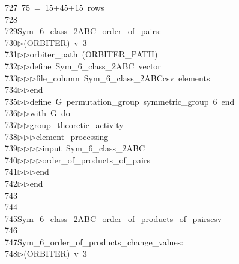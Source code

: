 \begin{tabbing}
727\>\ 75\ =\ 15+45+15\ rows\ \\[0pt]
728\>\\[0pt]
729\>Sym\_6\_class\_2ABC\_order\_of\_pairs:\\[0pt]
730\>$\triangleright$\>(ORBITER)\ v\ 3\ \\[0pt]
731\>$\triangleright$\>$\triangleright$\>orbiter\_path\ (ORBITER\_PATH)\ \\[0pt]
732\>$\triangleright$\>$\triangleright$\>define\ Sym\_6\_class\_2ABC\ vector\ \\[0pt]
733\>$\triangleright$\>$\triangleright$\>$\triangleright$\>file\_column\ Sym\_6\_class\_2ABCcsv\ elements\ \\[0pt]
734\>$\triangleright$\>$\triangleright$\>end\ \\[0pt]
735\>$\triangleright$\>$\triangleright$\>define\ G\ permutation\_group\ symmetric\_group\ 6\ end\ \\[0pt]
736\>$\triangleright$\>$\triangleright$\>with\ G\ do\ \\[0pt]
737\>$\triangleright$\>$\triangleright$\>group\_theoretic\_activity\ \\[0pt]
738\>$\triangleright$\>$\triangleright$\>$\triangleright$\>element\_processing\ \\[0pt]
739\>$\triangleright$\>$\triangleright$\>$\triangleright$\>$\triangleright$\>input\ Sym\_6\_class\_2ABC\ \\[0pt]
740\>$\triangleright$\>$\triangleright$\>$\triangleright$\>$\triangleright$\>order\_of\_products\_of\_pairs\ \\[0pt]
741\>$\triangleright$\>$\triangleright$\>$\triangleright$\>end\ \\[0pt]
742\>$\triangleright$\>$\triangleright$\>end\\[0pt]
743\>\\[0pt]
744\>\\[0pt]
745\>Sym\_6\_class\_2ABC\_order\_of\_products\_of\_pairscsv\\[0pt]
746\>\\[0pt]
747\>Sym\_6\_order\_of\_products\_change\_values:\\[0pt]
748\>$\triangleright$\>(ORBITER)\ v\ 3\ \\[0pt]

\end{tabbing}
